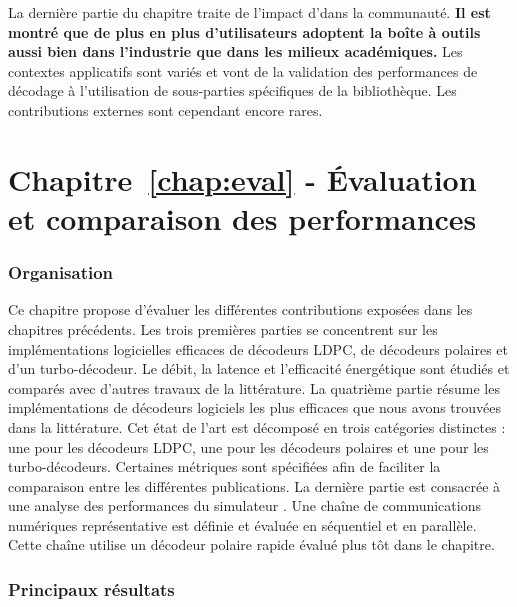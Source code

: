 La dernière partie du chapitre traite de l'impact d'\AFFECT dans la communauté.
\textbf{Il est montré que de plus en plus d'utilisateurs adoptent la boîte à
outils \AFFECT aussi bien dans l'industrie que dans les milieux académiques.}
Les contextes applicatifs sont variés et vont de la validation des performances
de décodage à l'utilisation de sous-parties spécifiques de la bibliothèque. Les
contributions externes sont cependant encore rares.

\section*{Chapitre~\ref{chap:eval} - Évaluation et comparaison des performances}

\subsubsection*{Organisation}

Ce chapitre propose d'évaluer les différentes contributions exposées dans les
chapitres précédents. Les trois premières parties se concentrent sur les
implémentations logicielles efficaces de décodeurs LDPC, de décodeurs polaires
et d'un turbo-décodeur. Le débit, la latence et l'efficacité énergétique sont
étudiés et comparés avec d'autres travaux de la littérature. La quatrième partie
résume les implémentations de décodeurs logiciels les plus efficaces que nous
avons trouvées dans la littérature. Cet état de l'art est décomposé en trois
catégories distinctes : une pour les décodeurs LDPC, une pour les décodeurs
polaires et une pour les turbo-décodeurs. Certaines métriques sont spécifiées
afin de faciliter la comparaison entre les différentes publications. La dernière
partie est consacrée à une analyse des performances du simulateur \AFFECT. Une
chaîne de communications numériques représentative est définie et évaluée en
séquentiel et en parallèle. Cette chaîne utilise un décodeur polaire rapide
évalué plus tôt dans le chapitre.

\subsubsection*{Principaux résultats}


